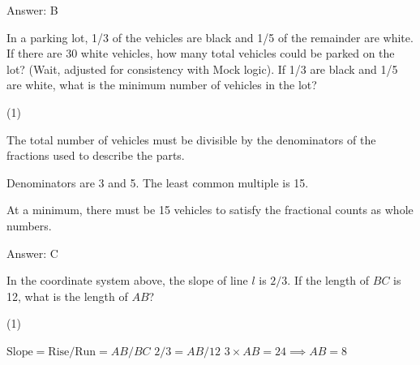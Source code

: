 \documentclass[11pt,paper=a4,answers]{exam}
\begin{document}
\begin{questions}
\begin{solution}
Answer: \colorbox{yellow!100}{B}
\end{solution}

\vspace{1cm}

\question
In a parking lot, 1/3 of the vehicles are black and 1/5 of the remainder are white. If there are 30 white vehicles, how many total vehicles could be parked on the lot? (Wait, adjusted for consistency with Mock logic). 
If 1/3 are black and 1/5 are white, what is the minimum number of vehicles in the lot?

\begin{tasks}(1)
    
\end{tasks}

\begin{solution}
The total number of vehicles must be divisible by the denominators of the fractions used to describe the parts.
\vspace{5pt}
\begin{center}
Denominators are 3 and 5.
\vspace{5pt}
The least common multiple is 15.
\end{center}
\vspace{5pt}
At a minimum, there must be 15 vehicles to satisfy the fractional counts as whole numbers.

Answer: \colorbox{yellow!100}{C}
\end{solution}

\vspace{1cm}

\question
\begin{center}
\end{center}
In the coordinate system above, the slope of line $l$ is $2/3$. If the length of $BC$ is 12, what is the length of $AB$?

\begin{tasks}(1)
    
\end{tasks}

\begin{solution}
\begin{center}
$\text{Slope} = \text{Rise} / \text{Run} = AB / BC$
\vspace{5pt}
$2/3 = AB / 12$
\vspace{5pt}
$3 \times AB = 24 \implies AB = 8$
\end{center}


\end{solution}
\end{questions}
\end{document}
